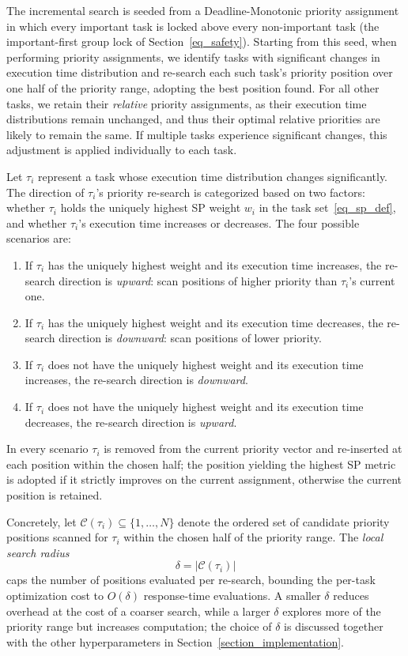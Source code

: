     The incremental search is seeded from a Deadline-Monotonic priority assignment in which every important task is locked above every non-important task (the important-first group lock of Section~\ref{eq_safety}).
    Starting from this seed, when performing priority assignments, we identify tasks with significant changes in execution time distribution and re-search each such task's priority position over one half of the priority range, adopting the best position found.
    For all other tasks, we retain their \textit{relative} priority assignments, as their execution time distributions remain unchanged, and thus their optimal relative priorities are likely to remain the same.
    If multiple tasks experience significant changes, this adjustment is applied individually to each task.


Let $\tau_i$ represent a task whose execution time distribution changes significantly.
The direction of $\tau_i$'s priority re-search is categorized based on two factors: whether $\tau_i$ holds the uniquely highest SP weight $w_i$ in the task set~\eqref{eq_sp_def}, and whether $\tau_i$'s execution time increases or decreases.
The four possible scenarios are:
\begin{enumerate}
    \item If $\tau_i$ has the uniquely highest weight and its execution time increases, the re-search direction is \emph{upward}: scan positions of higher priority than $\tau_i$'s current one.
    \item If $\tau_i$ has the uniquely highest weight and its execution time decreases, the re-search direction is \emph{downward}: scan positions of lower priority.
    \item If $\tau_i$ does not have the uniquely highest weight and its execution time increases, the re-search direction is \emph{downward}.
    \item If $\tau_i$ does not have the uniquely highest weight and its execution time decreases, the re-search direction is \emph{upward}.
\end{enumerate}
In every scenario $\tau_i$ is removed from the current priority vector and re-inserted at each position within the chosen half; the position yielding the highest SP metric is adopted if it strictly improves on the current assignment, otherwise the current position is retained.

Concretely, let $\mathcal{C}(\tau_i) \subseteq \{1,\dots,N\}$ denote the ordered set of candidate priority positions scanned for $\tau_i$ within the chosen half of the priority range.
The \emph{local search radius}
\begin{equation}
    \delta = |\mathcal{C}(\tau_i)|
    \label{eq:incremental_configuration}
\end{equation}
caps the number of positions evaluated per re-search, bounding the per-task optimization cost to $O(\delta)$ response-time evaluations.
A smaller $\delta$ reduces overhead at the cost of a coarser search, while a larger $\delta$ explores more of the priority range but increases computation; the choice of $\delta$ is discussed together with the other hyperparameters in Section~\ref{section_implementation}.

